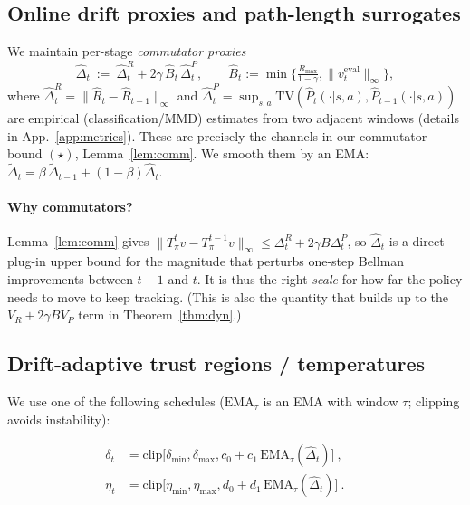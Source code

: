 \documentclass{article}
\theoremstyle{plain}
\theoremstyle{definition}
\theoremstyle{remark}
\newcommand{\1}{\mathbbm{1}}
\newcommand{\TV}{\mathrm{TV}}
\begin{document}
\subsection{Online drift proxies and path-length surrogates}
We maintain per-stage \emph{commutator proxies}
\begin{equation}
\widehat{\Delta}_t\ :=\ \widehat{\Delta}^R_t + 2\gamma\,\widehat{B}_t\,\widehat{\Delta}^P_t,
\qquad
\widehat{B}_t:=\min\!\Big\{\tfrac{R_{\max}}{1-\gamma}, \|v^{\text{eval}}_t\|_\infty\Big\},
\label{eq:com-proxy}
\end{equation}
where $\widehat{\Delta}^R_t=\|\widehat{R}_t-\widehat{R}_{t-1}\|_\infty$ and
$\widehat{\Delta}^P_t=\sup_{s,a}\TV(\widehat{P}_t(\cdot|s,a),\widehat{P}_{t-1}(\cdot|s,a))$ are
empirical (classification/MMD) estimates from two adjacent windows (details in
App.~\ref{app:metrics}). These are precisely the channels in our commutator bound
\((\star)\), Lemma~\ref{lem:comm}.  We smooth them by an EMA:
\(\widetilde{\Delta}_t=\beta\,\widetilde{\Delta}_{t-1}+(1-\beta)\widehat{\Delta}_t\).

\paragraph{Why commutators?}
Lemma~\ref{lem:comm} gives
\(\|T^t_\pi v - T^{t-1}_\pi v\|_\infty \le \Delta^R_t + 2\gamma B \Delta^P_t\),
so \(\widehat{\Delta}_t\) is a direct plug-in upper bound for the magnitude that perturbs
one-step Bellman improvements between $t-1$ and $t$. It is thus the right \emph{scale}
for how far the policy needs to move to keep tracking. (This is also the quantity that
builds up to the $V_R+2\gamma B V_P$ term in Theorem~\ref{thm:dyn}.)

\subsection{Drift-adaptive trust regions / temperatures}
We use one of the following schedules (\(\mathrm{EMA}_\tau\) is an EMA with window \(\tau\); clipping avoids instability):

\begin{align}
\ \delta_t &= \mathrm{clip}\!\Big[\delta_{\min},\delta_{\max}, c_0 + c_1\,\mathrm{EMA}_\tau(\widehat{\Delta}_t)\Big]\ \!,
\qquad\\
\ \eta_t &= \mathrm{clip}\!\Big[\eta_{\min},\eta_{\max}, d_0 + d_1\,\mathrm{EMA}_\tau(\widehat{\Delta}_t)\Big]\ \!.
\label{eq:adaptive-rules}
\end{align}
\end{document}
